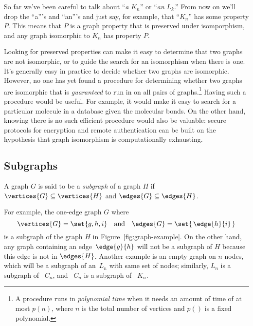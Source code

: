  So far we've been careful to talk about ``\emph{a} $K_n$'' or
``\emph{an} $L_k$.''  From now on we'll drop the ``a'''s and ``an'''s
and just say, for example, that ``$K_n$'' has some property $P$.  This
means that $P$ is a graph property that is preserved under isomporphism,
and any graph isomorphic to $K_n$ has property $P$.

Looking for preserved properties can make it easy to determine that two
graphs are not isomorphic, or to guide the search for an 
isomorphism when there is one.  It's generally easy in practice to decide
whether two graphs are isomorphic.  However, no one has yet found a
procedure for determining whether two graphs are isomorphic that is
\emph{guaranteed} to run in  on all pairs of
graphs.\footnote{ A procedure runs in \emph{polynomial
    time} when it needs an amount of time of at most $ p(n)$, where
  $n$ is the total number of vertices and $p()$ is a fixed polynomial.}
Having such a procedure would be useful.  For example, it would make it
easy to search for a particular molecule in a database given the molecular
bonds.  On the other hand, knowing there is no such efficient procedure
would also be valuable: secure protocols for encryption and remote
authentication can be built on the hypothesis that graph isomorphism is
computationally exhausting.

\subsection{Subgraphs}

\begin{definition}\label{def:subgraph}
  A graph $G$ is said to be a \emph{subgraph} of a graph $H$ if
  $\vertices{G} \subseteq \vertices{H}$ and $\edges{G} \subseteq
  \edges{H}$.
\end{definition}

For example, the one-edge graph $G$ where
\begin{equation*}
   \vertices{G} = \set{ g, h, i } \quad \text{and}\quad  \edges{G} =
   \set{\, \edge{h}{i} \, }
\end{equation*}
is a subgraph of the graph $H$ in Figure~\ref{fig:graph-example}.  On the
other hand, any graph containing an edge~$\edge{g}{h}$ will not be a
subgraph of $H$ because this edge is not in $\edges{H}$.  Another example
is an empty graph on $n$ nodes, which will be a subgraph of an~$L_n$ with
same set of nodes; similarly, $L_n$ is a subgraph of ~$C_n$, and ~$C_n$ is
a subgraph of ~$K_n$.

